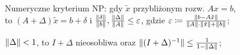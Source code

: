 \entry
Numeryczne kryterium NP:
gdy $\tilde{x}$ przybliżonym rozw. $Ax=b$,\\
to $(A+\Delta)\tilde{x}=b+\delta$
i $\frac{\|\delta\|}{\|b\|}, \frac{\|\Delta\|}{\|A\|} \leq \varepsilon$,
gdzie $\varepsilon \coloneqq \frac{\|b-A\tilde{x}\|}{\|A\| \cdot \|\tilde{x}\| + \|b\| }$;


\entry
$\|\Delta\| < 1$,
to $I + \Delta$ nieosobliwa
oraz $\|(I + \Delta)^{-1}\| \leq \frac{1}{1 - \|\Delta\|}$;

